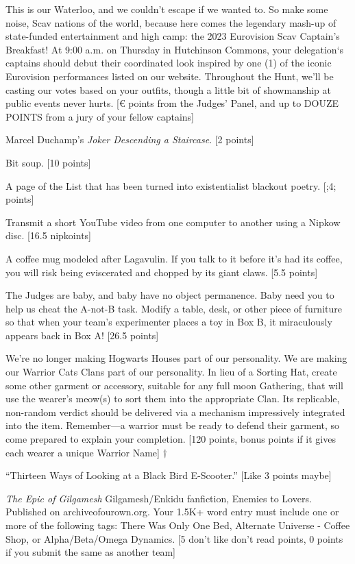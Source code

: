\documentclass{book}
\begin{document}
\begin{list}{}{}
\item This is our Waterloo, and we couldn’t escape if we wanted to. So make some noise, Scav nations of the world, because here comes the legendary mash-up of state-funded entertainment and high camp: the 2023 Eurovision Scav Captain’s Breakfast! At 9:00 a.m. on Thursday in Hutchinson Commons, your delegation‘s captains should debut their coordinated look inspired by one (1) of the iconic Eurovision performances listed on our website. Throughout the Hunt, we’ll be casting our votes based on your outfits, though a little bit of showmanship at public events never hurts. [€ points from the Judges’ Panel, and up to DOUZE POINTS from a jury of your fellow captains]
\item Marcel Duchamp's \textit{Joker Descending a Staircase}. [2 points]
\item Bit soup. [10 points]
\item A page of the List that has been turned into existentialist blackout poetry. [;4; points]
\item Transmit a short YouTube video from one computer to another using a Nipkow disc. [16.5 nipkoints]
\item A coffee mug modeled after Lagavulin. If you talk to it before it's had its coffee, you will risk being eviscerated and chopped by its giant claws. [5.5 points]
\item The Judges are baby, and baby have no object permanence. Baby need you to help us cheat the A-not-B task. Modify a table, desk, or other piece of furniture so that when your team’s experimenter places a toy in Box B, it miraculously appears back in Box A! [26.5 points]
\newpage
\item We’re no longer making Hogwarts Houses part of our personality. We are making our Warrior Cats Clans part of our personality. In lieu of a Sorting Hat, create some other garment or accessory, suitable for any full moon Gathering, that will use the wearer’s meow(s) to sort them into the appropriate Clan. Its replicable, non-random verdict should be delivered via a mechanism impressively integrated into the item. Remember---a warrior must be ready to defend their garment, so come prepared to explain your completion. [120 points, bonus points if it gives each wearer a unique Warrior Name] $\dagger$
\item “Thirteen Ways of Looking at a Black Bird E-Scooter.” [Like 3 points maybe]
\item \textit{The Epic of Gilgamesh} Gilgamesh/Enkidu fanfiction, Enemies to Lovers. Published on archiveofourown.org. Your 1.5K+ word entry must include one or more of the following tags: There Was Only One Bed, Alternate Universe - Coffee Shop, or Alpha/Beta/Omega Dynamics. [5 don't like don't read points, 0 points if you submit the same as another team] \textleaf

\end{list}
\end{document}
